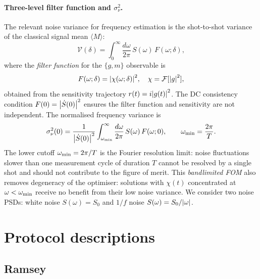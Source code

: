 \documentclass[12pt]{article}
\begin{document}
\paragraph{Three-level filter function and $\sigma^2_\nu$.}
The relevant noise variance for frequency estimation is the shot-to-shot
variance of the classical signal mean $\langle M\rangle$:
\begin{equation}
    \mathcal{V}(\delta)
    = \int_0^\infty \frac{d\omega}{2\pi}\, S(\omega)\, F(\omega;\delta),
    \label{eq:kubo3}
\end{equation}
where the \emph{filter function} for the $\{g,m\}$ observable is
\begin{equation}
    F(\omega;\delta)
    = \abs{\chi(\omega;\delta)}^2,
    \quad
    \chi = \mathcal{F}[\abs{g}^2],
    \label{eq:Fe}
\end{equation}
obtained from the sensitivity trajectory $r(t)=i\abs{g(t)}^2$.
The DC consistency condition $F(0) = \abs{\dot{S}(0)}^2$ ensures the filter
function and sensitivity are not independent.
The normalised frequency variance is
\begin{equation}
    \sigma^2_\nu(0)
    = \frac{1}{\abs{\dot{S}(0)}^2}
      \int_{\omega_{\rm min}}^\infty \frac{d\omega}{2\pi}\, S(\omega)\, F(\omega;0),
    \qquad
    \omega_{\rm min} = \frac{2\pi}{T}.
    \label{eq:fom3}
\end{equation}
The lower cutoff $\omega_{\rm min} = 2\pi/T$ is the Fourier resolution limit:
noise fluctuations slower than one measurement cycle of duration $T$ cannot
be resolved by a single shot and should not contribute to the figure of merit.
This \emph{bandlimited FOM} also removes degeneracy of the optimiser: solutions
with $\chi(t)$ concentrated at $\omega < \omega_{\rm min}$ receive no benefit
from their low noise variance.
We consider two noise PSDs: white noise $S(\omega) = S_0$ and $1/f$ noise
$S(\omega) = S_0/\abs{\omega}$.


\section{Protocol descriptions}

\subsection{Ramsey}
\end{document}
